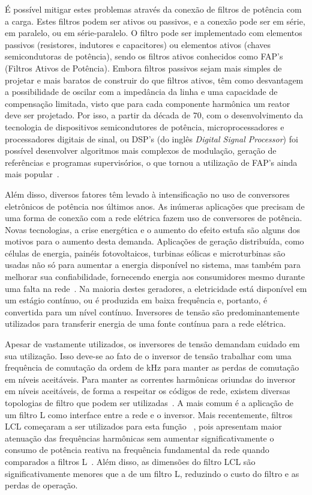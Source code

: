 	É possível mitigar estes problemas através da conexão de filtros de potência com a carga. Estes filtros podem ser ativos ou passivos, e a conexão pode ser em série, em paralelo, ou em série-paralelo. O filtro pode ser implementado com elementos passivos (resistores, indutores e capacitores) ou elementos ativos (chaves semicondutoras de potência), sendo os filtros ativos conhecidos como FAP's (Filtros Ativos de Potência). Embora filtros passivos sejam mais simples de projetar e mais baratos de construir do que filtros ativos, têm como desvantagem a possibilidade de oscilar com a impedância da linha e uma capacidade de compensação limitada, visto que para cada componente harmônica um reator deve ser projetado. Por isso, a partir da década de $70$, com o desenvolvimento da tecnologia de dispositivos semicondutores de potência, microprocessadores e processadores digitais de sinal, ou DSP's (do inglês \emph{Digital Signal Processor}) foi possível desenvolver algoritmos mais complexos de modulação, geração de referências e programas supervisórios, o que tornou a utilização de FAP's ainda mais popular~\cite{ref:SASAKI}.

	Além disso, diversos fatores têm levado à intensificação no uso de conversores eletrônicos	de potência nos últimos anos. As inúmeras aplicações que precisam de uma forma de conexão com a rede elétrica fazem uso de conversores de potência. Novas tecnologias, a crise energética e o aumento do efeito estufa são alguns dos motivos para o aumento desta demanda. Aplicações de geração distribuída, como células de energia,	painéis fotovoltaicos, turbinas eólicas e microturbinas são usadas não só para aumentar a energia disponível no sistema, mas também para melhorar sua confiabilidade, fornecendo energia aos consumidores mesmo durante uma falta na rede~\cite{ref:KARSHENAS}.	Na maioria destes geradores, a eletricidade está disponível em um estágio contínuo, ou é produzida em baixa frequência e, portanto, é convertida para um nível contínuo. Inversores de tensão são predominantemente utilizados para transferir energia de uma fonte contínua para a rede elétrica.

	Apesar de vastamente utilizados, os inversores de tensão demandam cuidado em sua utilização. Isso deve-se ao fato de o inversor de tensão trabalhar com uma frequência de comutação da ordem de kHz para manter as perdas de comutação em níveis aceitáveis. Para manter as correntes harmônicas oriundas do inversor em níveis aceitáveis, de forma a respeitar os códigos de rede, existem diversas topologias de filtro que podem ser utilizadas~\cite{ref:RIBEIRO}. A mais comum é a aplicação de um filtro L como interface entre a rede e o inversor. Mais recentemente, filtros LCL começaram a ser utilizados para esta função~\cite{ref:LINDGREN}\cite{ref:TEODORESCU} \cite{ref:XU}, pois apresentam maior atenuação das frequências harmônicas sem aumentar significativamente o consumo de potência reativa na frequência fundamental da rede quando comparados a filtros L~\cite{ref:FUCHS}. Além disso, as dimensões do filtro LCL são significativamente menores que a de um filtro L, reduzindo o custo do filtro e as perdas de operação.

